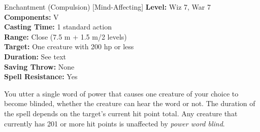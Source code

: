 {Enchantment (Compulsion) [Mind-Affecting]}
{
	\textbf{Level:}
	Wiz 7, War 7\\
	\textbf{Components:}
	V\\
	\textbf{Casting Time:}
	1 standard action\\
	\textbf{Range:}
	Close (7.5 m + 1.5 m/2 levels)\\
	\textbf{Target:}
	One creature with 200 hp or less\\
	\textbf{Duration:}
	See text\\
	\textbf{Saving Throw:}
	None\\
	\textbf{Spell Resistance:}
	Yes\\
}
{

	You utter a single word of power that causes one creature of your choice to become blinded, whether the creature can hear the word or not. The duration of the spell depends on the target's current hit point total. Any creature that currently has 201 or more hit points is unaffected by \emph{power word blind}.

}
